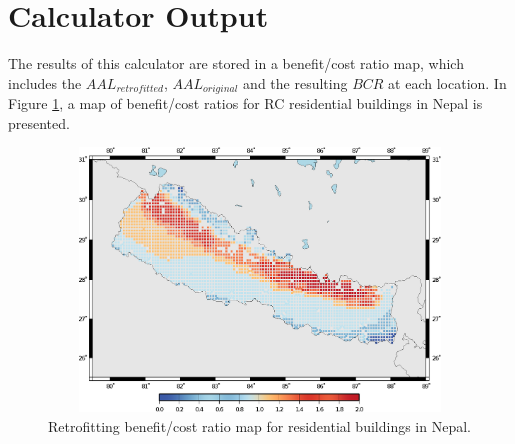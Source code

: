 \section{Calculator Output}
The results of this calculator are stored in a benefit/cost ratio map, which includes the $AAL_{retrofitted}$, $AAL_{original}$ and the resulting $BCR$ at each location. In Figure \ref{fig:BCRMap}, a map of benefit/cost ratios for RC residential buildings in Nepal is presented.

\begin{figure}[ht]
\centering
\includegraphics[width=12cm,height=7cm]{./figures/risk/BenefitCostRatioMap.eps}
\caption{Retrofitting benefit/cost ratio map for residential buildings in Nepal.}
\label{fig:BCRMap}
\end{figure}